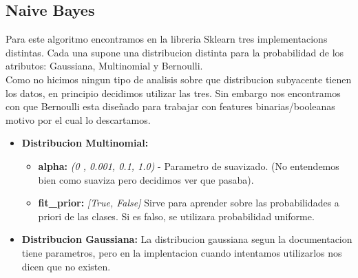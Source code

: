 \subsection{Naive Bayes}

Para este algoritmo encontramos en la libreria Sklearn tres implementacions distintas. Cada una supone una distribucion distinta para la probabilidad de los atributos: Gaussiana, Multinomial y Bernoulli.\\


Como no hicimos ningun tipo de analisis sobre que distribucion subyacente tienen los datos, en principio decidimos utilizar las tres. Sin embargo nos encontramos con que Bernoulli esta diseñado para trabajar con features binarias/booleanas motivo por el cual lo descartamos.


\begin{itemize}
\item \textbf{Distribucion Multinomial:}
	\begin{itemize}
	\item \textbf{alpha:} \textit{(0 , 0.001, 0.1, 1.0)} - Parametro de suavizado. (No entendemos bien como suaviza pero decidimos ver que pasaba).
	\item \textbf{fit\_prior:} \textit{[True, False]} Sirve para aprender sobre las probabilidades a priori de las clases. Si es falso, se utilizara probabilidad uniforme.
	\end{itemize}


\item \textbf{Distribucion Gaussiana:} La distribucion gaussiana segun la documentacion tiene parametros, pero en la implentacion cuando intentamos utilizarlos nos dicen que no existen.

\end{itemize}






